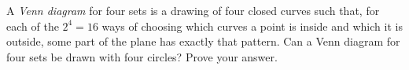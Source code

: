 A \emph{Venn diagram} for four sets is a drawing of four closed curves such that, for each of the $2^4=16$ ways of choosing which curves a point is inside and which it is outside, some part of the plane has exactly that pattern. Can a Venn diagram for four sets be drawn with four circles? Prove your answer.
